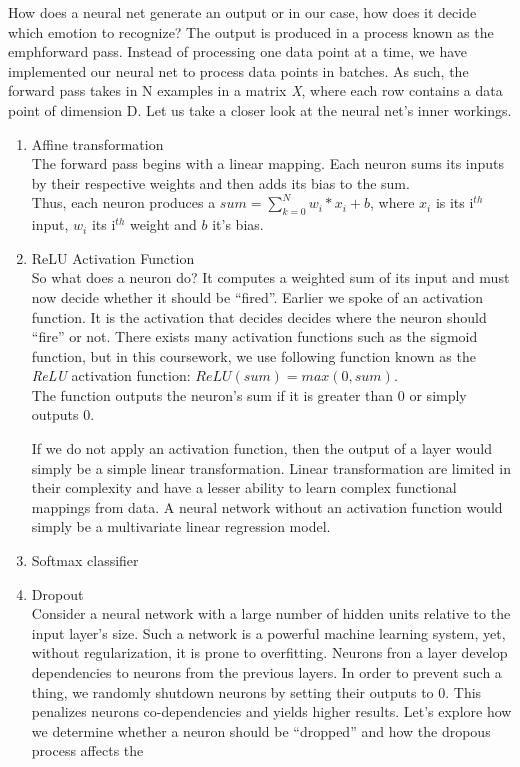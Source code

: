 How does a neural net generate an output or in our case, how does it decide which emotion to recognize?
The output is produced in a process known as the emph{forward pass}.
Instead of processing one data point at a time,
we have implemented our neural net to process data points in batches.
As such, the forward pass takes in N examples in a matrix \emph{X}, where each row contains a data point of dimension D.
Let us take a closer look at the neural net's inner workings.

\begin{enumerate}
   \item Affine transformation\\
     The forward pass begins with a linear mapping.
     Each neuron sums its inputs by their respective weights and then adds its bias to the sum.\\
     Thus, each neuron produces a $sum = \sum_{k=0}^{N} w_i * x_i + b$,
     where $x_i$ is its i$^{th}$ input, $w_i$ its i$^{th}$ weight and $b$ it's bias.
     
   \item ReLU Activation Function\\
     So what does a neuron do? It computes a weighted sum of its input and must now decide whether it should be ``fired''.
     Earlier we spoke of an activation function.
     It is the activation that decides decides where the neuron should ``fire'' or not. 
     There exists many activation functions such as the sigmoid function,
     but in this coursework, we use following function known as the \emph{ReLU} activation function:
     $ReLU(sum) = max(0,sum)$.\\
     The function outputs the neuron's sum if it is greater than 0 or simply outputs 0.

     If we do not apply an activation function, then the output of a layer would simply be a simple linear transformation.
     Linear transformation are limited in their complexity and have a lesser ability to learn complex functional mappings from data.
     A neural network without an activation function would simply be a multivariate linear regression model.


   \item Softmax classifier\\
   




   \item Dropout\\
     Consider a neural network with a large number of hidden units relative to the input layer's size.
     Such a network is a powerful machine learning system, yet, without regularization, it is prone to overfitting.
     Neurons fron a layer develop dependencies to neurons from the previous layers.
     In order to prevent such a thing, we randomly shutdown neurons by setting their outputs to 0.
     This penalizes neurons co-dependencies and yields higher results.
     Let's explore how we determine whether a neuron should be ``dropped'' and how the dropous process affects the 
     
     
     




\end{enumerate}     

